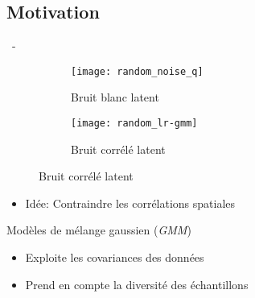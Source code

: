 \documentclass[aspectratio=169, 22pt]{beamer}
\begin{document}
\subsection{Motivation}
\begin{frame}{\secname~- \subsecname}
  \begin{figure}\centering
    \begin{subfigure}{0.3\linewidth}\centering
      \texttt{[image: random\_noise\_q]}
      \caption{Bruit blanc latent}
    \end{subfigure}
    \begin{subfigure}{0.3\linewidth}\centering
      \texttt{[image: random\_lr-gmm]}
      \caption{Bruit corrélé latent}
    \end{subfigure}
  \end{figure}
  \begin{itemize}\centering
  \item \alert{Idée}: Contraindre les \alert{corrélations spatiales} 
  \end{itemize}
  \begin{exampleblock}{Modèles de mélange gaussien (\emph{GMM})}
    \begin{itemize}
    \item Exploite les covariances des données
    \item Prend en compte la diversité des échantillons
    \end{itemize}
  \end{exampleblock}  
\end{frame}
\end{document}
